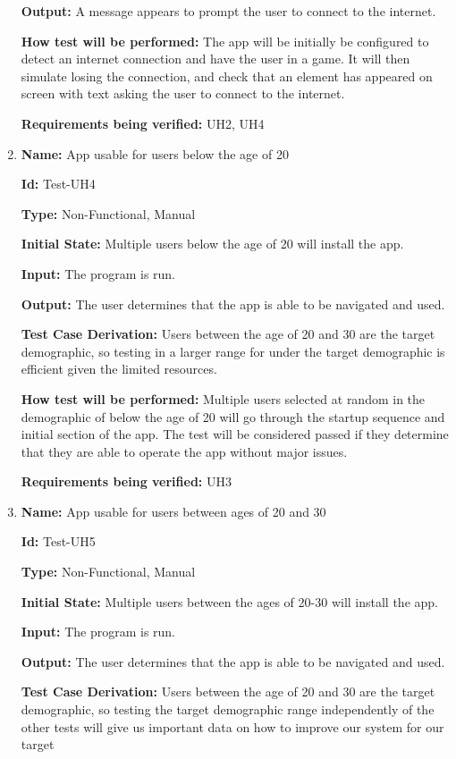 \documentclass[12pt, titlepage]{article}
\begin{document}
\begin{enumerate}
\textbf{Output:} A message appears to prompt the user to connect to the internet. 
					
\textbf{How test will be performed:} The app will be initially be configured to detect an internet connection and have the user in a game. It will then simulate losing the connection, and check that an element has appeared on screen with text asking the user to connect to the internet. 

\textbf{Requirements being verified:} UH2, UH4

\item{\textbf{Name:} App usable for users below the age of 20}

\textbf{Id:} Test-UH4

\textbf{Type:} Non-Functional, Manual
					
\textbf{Initial State:} Multiple users below the age of 20 will install the app.
					
\textbf{Input:} The program is run.
					
\textbf{Output:} The user determines that the app is able to be navigated and used.

\textbf{Test Case Derivation:} Users between the age of 20 and 30 are the target demographic, so testing in a larger range for under the target demographic is efficient given the limited resources.  
					
\textbf{How test will be performed:} Multiple users selected at random in the demographic of below the age of 20 will go through the startup sequence and initial section of the app. The test will be considered passed if they determine that they are able to operate the app without major issues. 

\textbf{Requirements being verified:} UH3

\item{\textbf{Name:} App usable for users between ages of 20 and 30}

\textbf{Id:} Test-UH5

\textbf{Type:} Non-Functional, Manual
					
\textbf{Initial State:} Multiple users between the ages of 20-30 will install the app.
					
\textbf{Input:} The program is run.
					
\textbf{Output:} The user determines that the app is able to be navigated and used.

\textbf{Test Case Derivation:} Users between the age of 20 and 30 are the target demographic, so testing the target demographic range independently of the other tests will give us important data on how to improve our system for our target 
					

\end{enumerate}
\end{document}
